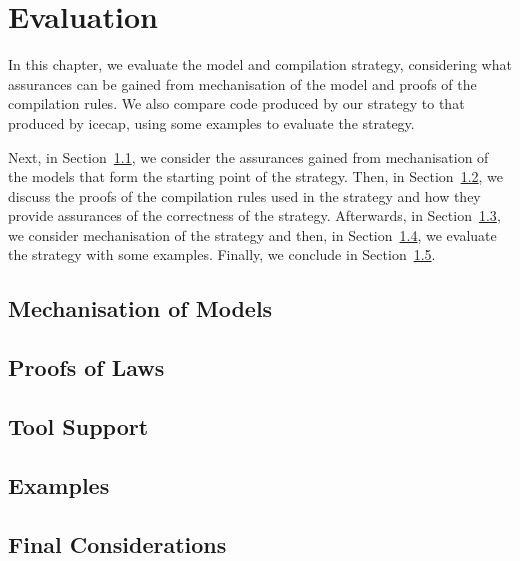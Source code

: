 \chapter{Evaluation}
\label{evaluation-chapter}

In this chapter, we evaluate the model and compilation strategy,
considering what assurances can be gained from mechanisation of the
model and proofs of the compilation rules.
We also compare code produced by our strategy to that produced by icecap,
using some examples to evaluate the strategy.

Next, in Section~\ref{mechanisation-of-models-section}, we consider
the assurances gained from mechanisation of the models that form the
starting point of the strategy.
Then, in Section~\ref{proofs-of-laws-section}, we discuss the proofs of
the compilation rules used in the strategy and how they provide
assurances of the correctness of the strategy.
Afterwards, in Section~\ref{tool-support-section}, we consider
mechanisation of the strategy and then, in
Section~\ref{examples-section}, we evaluate the strategy with some
examples.
Finally, we conclude in
Section~\ref{evaluation-final-considerations-section}.


\section{Mechanisation of Models}
\label{mechanisation-of-models-section}


\section{Proofs of Laws}
\label{proofs-of-laws-section}


\section{Tool Support}
\label{tool-support-section}


\section{Examples}
\label{examples-section}


\section{Final Considerations}
\label{evaluation-final-considerations-section}